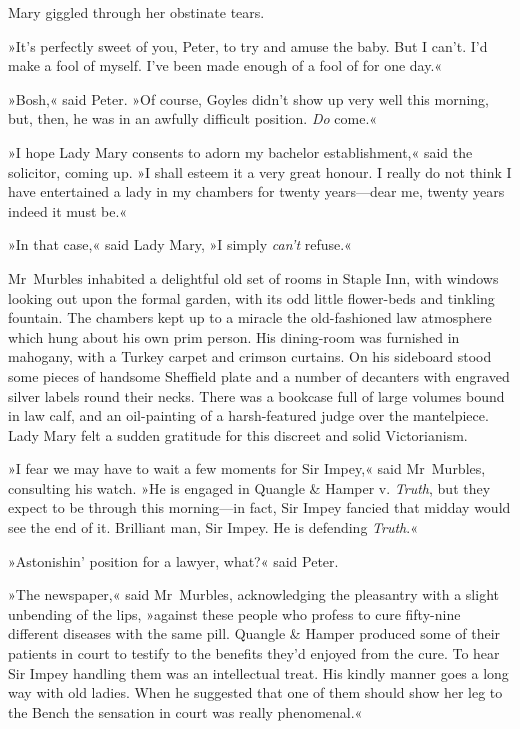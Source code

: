 Mary giggled through her obstinate tears.

»It's perfectly sweet of you, Peter, to try and amuse the baby. But I can't. I'd make a fool of myself. I've been made enough of a fool of for one day.«

»Bosh,« said Peter. »Of course, Goyles didn't show up very well this morning, but, then, he was in an awfully difficult position. \textit{Do} come.«

»I hope Lady Mary consents to adorn my bachelor establishment,« said the solicitor, coming up. »I shall esteem it a very great honour. I really do not think I have entertained a lady in my chambers for twenty years—dear me, twenty years indeed it must be.«

»In that case,« said Lady Mary, »I simply \textit{can't} refuse.«

Mr~Murbles inhabited a delightful old set of rooms in Staple Inn, with windows looking out upon the formal garden, with its odd little flower-beds and tinkling fountain. The chambers kept up to a miracle the old-fashioned law atmosphere which hung about his own prim person.  His dining-room was furnished in mahogany, with a Turkey carpet and crimson curtains. On his sideboard stood some pieces of handsome Sheffield plate and a number of decanters with engraved silver labels round their necks. There was a bookcase full of large volumes bound in law calf, and an oil-painting of a harsh-featured judge over the mantelpiece. Lady Mary felt a sudden gratitude for this discreet and solid Victorianism.

»I fear we may have to wait a few moments for Sir Impey,« said Mr~Murbles, consulting his watch. »He is engaged in Quangle \& Hamper v.  \textit{Truth}, but they expect to be through this morning—in fact, Sir Impey fancied that midday would see the end of it. Brilliant man, Sir Impey.  He is defending \textit{Truth}.«

»Astonishin' position for a lawyer, what?« said Peter.

»The newspaper,« said Mr~Murbles, acknowledging the pleasantry with a slight unbending of the lips, »against these people who profess to cure fifty-nine different diseases with the same pill. Quangle \& Hamper produced some of their patients in court to testify to the benefits they'd enjoyed from the cure. To hear Sir Impey handling them was an intellectual treat. His kindly manner goes a long way with old ladies.  When he suggested that one of them should show her leg to the Bench the sensation in court was really phenomenal.«

